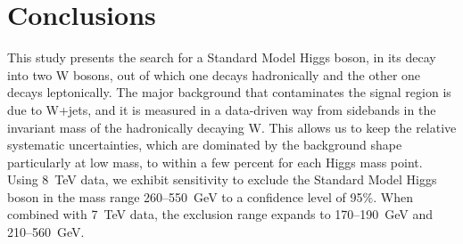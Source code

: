 \section{Conclusions}
\label{sec:conclusions}

This study presents the search for a Standard Model Higgs boson, 
in its decay into two W bosons, 
out of which one decays hadronically and the other one decays leptonically.
The major background that contaminates the signal region is due to W+jets, 
and it is measured in a data-driven way from sidebands in the invariant mass
of the hadronically decaying W.
This allows us to keep the relative systematic uncertainties, 
which are dominated by the background shape particularly at low mass, to within
a few percent for each Higgs mass point. 
Using 8~TeV data, we
exhibit sensitivity to
exclude the Standard Model 
Higgs boson in the mass range
260--550~GeV
to a confidence level of 95\%.
When combined with 7~TeV data, the exclusion range expands to
170--190~GeV and 210--560~GeV.
